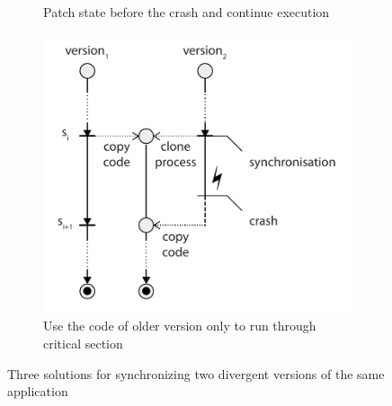 \begin{figure}[!t]
\begin{center}
\begin{subfigure}[b]{0.4\textwidth}
      \caption{Patch state before the crash and continue execution}
      \label{fig:recovery-solution2}
    \end{subfigure}
    \quad
    \begin{subfigure}[b]{0.4\textwidth}
      \includegraphics[width=\textwidth]{multi-version/figures/solution3}
      \caption{Use the code of older version only to run through critical section}
      \label{fig:recovery-solution3}
    \end{subfigure}
    \caption{Three solutions for synchronizing two divergent versions of the same application}
    \label{fig:recovery-solutions}
  \end{center}
\end{figure}

